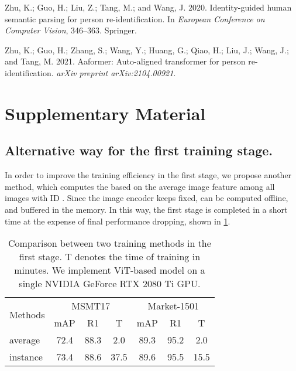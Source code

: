 \documentclass[letterpaper]{article} \usepackage{aaai23}  \usepackage{times}  \usepackage{helvet}  \usepackage{courier}  \usepackage[hyphens]{url}  \usepackage{graphicx} \urlstyle{rm} \def\UrlFont{\rm}  \usepackage{natbib}  \usepackage{caption} \frenchspacing  \setlength{\pdfpagewidth}{8.5in}  \setlength{\pdfpageheight}{11in}  \usepackage{algorithm}
\begin{document}
\begin{small}
\begin{thebibliography}{65}
Zhu, K.; Guo, H.; Liu, Z.; Tang, M.; and Wang, J. 2020.
\newblock Identity-guided human semantic parsing for person re-identification.
\newblock In \emph{European Conference on Computer Vision}, 346--363. Springer.

Zhu, K.; Guo, H.; Zhang, S.; Wang, Y.; Huang, G.; Qiao, H.; Liu, J.; Wang, J.;
  and Tang, M. 2021.
\newblock Aaformer: Auto-aligned transformer for person re-identification.
\newblock \emph{arXiv preprint arXiv:2104.00921}.

\end{thebibliography}

\end{small}

\appendix
\clearpage
\section{Supplementary Material}

\subsection{Alternative way for the first training stage. }
In order to improve the training efficiency in the first stage, we propose another method, which computes the  based on the average image feature  among all images with ID . 
Since the image encoder keeps fixed,  can be computed offline, and buffered in the memory. In this way, the first stage is completed in a short time at the expense of final performance dropping, shown in \cref{tab:onestageupdate}. 


\begin{table}[h]
\centering
\begin{tabular}{l|cccccc}
    \hline
    \multirow{2}{*}{Methods} & \multicolumn{3}{c}{MSMT17} & \multicolumn{3}{c}{Market-1501} \\
    & mAP & R1 & T & mAP & R1 & T\\ \hline
    average & 72.4 & 88.3 & 2.0 & 89.3 & 95.2 & 2.0\\
    instance & 73.4 & 88.6 & 37.5 & 89.6 & 95.5 & 15.5\\
    \hline
\end{tabular}
\caption{Comparison between two training methods in the first stage. T denotes the time of training in minutes. We implement ViT-based model on a single NVIDIA GeForce RTX 2080 Ti GPU. }
\label{tab:onestageupdate}
\end{table}
\end{document}
